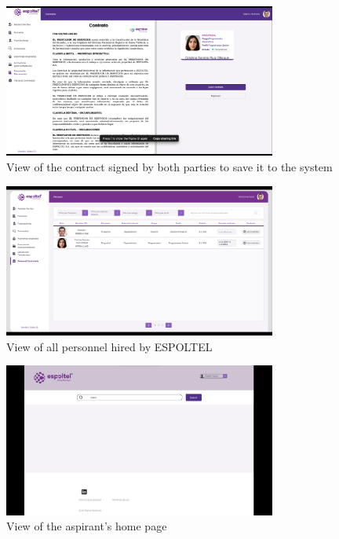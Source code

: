 \documentclass{scrreprt}
\begin{document}
\begin{figure}[H]
	\centering \small
	\includegraphics[width=0.8\textwidth]{WebPrototype/wflow-42.jpeg}
	\caption{View of the contract signed by both parties to save it to the system}
\end{figure}

\begin{figure}[H]
	\centering \small
	\includegraphics[width=0.8\textwidth]{WebPrototype/wflow-43.jpeg}
	\caption{View of all personnel hired by ESPOLTEL}
\end{figure}

\begin{figure}[H]
	\centering \small
	\includegraphics[width=0.8\textwidth]{WebPrototype/wflow-44.jpeg}
	\caption{View of the aspirant's home page}
\end{figure}
\end{document}
